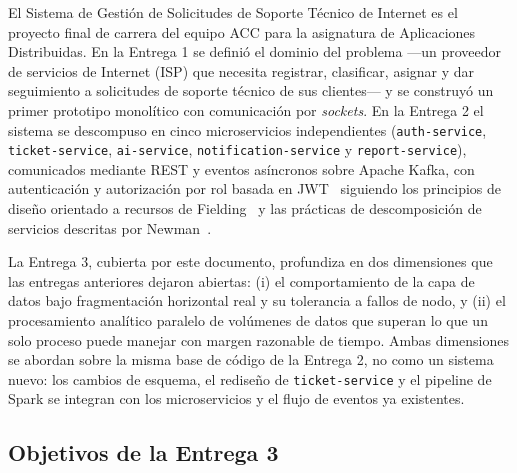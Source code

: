 \documentclass[11pt,letterpaper]{article}
\begin{document}
El Sistema de Gestión de Solicitudes de Soporte Técnico de Internet es el proyecto final de
carrera del equipo ACC para la asignatura de Aplicaciones Distribuidas. En la Entrega 1 se
definió el dominio del problema —un proveedor de servicios de Internet (ISP) que necesita
registrar, clasificar, asignar y dar seguimiento a solicitudes de soporte técnico de sus
clientes— y se construyó un primer prototipo monolítico con comunicación por \emph{sockets}. En
la Entrega 2 el sistema se descompuso en cinco microservicios independientes
(\texttt{auth-service}, \texttt{ticket-service}, \texttt{ai-service}, \texttt{notification-service}
y \texttt{report-service}), comunicados mediante REST y eventos asíncronos sobre Apache Kafka, con
autenticación y autorización por rol basada en JWT~\cite{jones2015jwt} siguiendo los principios de
diseño orientado a recursos de Fielding~\cite{fielding2000rest} y las prácticas de descomposición
de servicios descritas por Newman~\cite{newman2021microservices}.

La Entrega 3, cubierta por este documento, profundiza en dos dimensiones que las entregas
anteriores dejaron abiertas: (i) el comportamiento de la capa de datos bajo fragmentación
horizontal real y su tolerancia a fallos de nodo, y (ii) el procesamiento analítico paralelo de
volúmenes de datos que superan lo que un solo proceso puede manejar con margen razonable de
tiempo. Ambas dimensiones se abordan sobre la misma base de código de la Entrega 2, no como un
sistema nuevo: los cambios de esquema, el rediseño de \texttt{ticket-service} y el pipeline de
Spark se integran con los microservicios y el flujo de eventos ya existentes.

\subsection{Objetivos de la Entrega 3}
\end{document}
